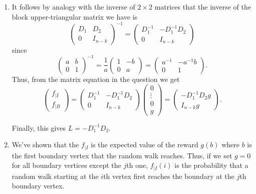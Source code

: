 \documentclass[12 pt, letterpaper]{hmcpset}
\begin{document}
\begin{solution}
	\begin{enumerate}
		\item It follows by analogy with the inverse of $2 \times 2$ matrices that the inverse of the block upper-triangular matrix we have is
			\[
					\begin{pmatrix}
			D_{1} & D_{2} \\
			0 & I_{n - k}
		\end{pmatrix}^{-1} = \begin{pmatrix}
					D_{1}^{-1} & -D_{1}^{-1} D_{2} \\
					0 & I_{n - k}
				\end{pmatrix}
			\]
			since
			\[
				\begin{pmatrix}
					a & b \\
					0 & 1
				\end{pmatrix}^{-1} = \frac{1}{a} \begin{pmatrix}
					1 & -b \\
					0 & a
				\end{pmatrix} = \begin{pmatrix}
					a^{-1} & -a^{-1} b \\
					0 & 1
				\end{pmatrix}.
			\]
			Thus, from the matrix equation in the question we get
			\[
				\begin{pmatrix}
					f_{\mid I} \\
					f_{\mid B}
				\end{pmatrix} =  \begin{pmatrix}
					D_{1}^{-1} & -D_{1}^{-1} D_{2} \\
					0 & I_{n - k}
				\end{pmatrix} \begin{pmatrix}
					0 \\
					\vdots \\
					0 \\
					g
				\end{pmatrix} = \begin{pmatrix}
					-D_{1}^{-1} D_{2} g \\
					I_{n - k} g
				\end{pmatrix}.
			\]

			Finally, this gives $L = -D_{1}^{-1} D_{2}$.
		\item We've shown that the $f_{\mid I}$ is the expected value of the reward $g(b)$ where $b$ is the first boundary vertex that the random walk reaches. Thus, if we set $g = 0$ for all boundary vertices except the $j$th one, $f_{\mid I}(i)$ is the probability that a random walk starting at the $i$th vertex first reaches the boundary at the $j$th boundary vertex.


\end{enumerate}
\end{solution}
\end{document}
